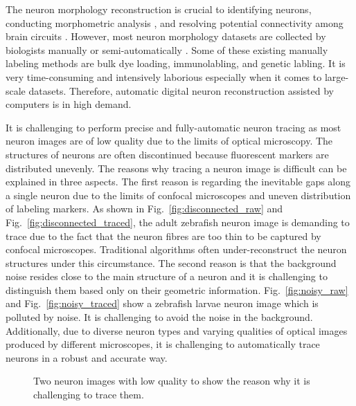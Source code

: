 \documentclass[conference]{IEEEtran}
\begin{document}
The neuron morphology reconstruction is crucial to identifying neurons\cite{background5}, conducting morphometric analysis \cite{background3}, and resolving potential connectivity among brain circuits \cite{background1}. However, most neuron morphology datasets are collected by biologists manually or semi-automatically \cite{background1}. Some of these existing manually labeling methods are bulk dye loading\cite{label1}, immunolabling\cite{label2}, and genetic labling\cite{genetic_label}.
It is very time-consuming and intensively laborious especially when it comes to large-scale datasets.  Therefore, automatic digital neuron reconstruction assisted by computers is in high demand.

It is challenging to perform precise and fully-automatic neuron tracing as most neuron images are of low quality due to the limits of optical microscopy. The structures of neurons are often discontinued because fluorescent markers are distributed unevenly. The reasons why tracing a neuron image is difficult can be explained in three aspects. The first reason is regarding the inevitable gaps along a single neuron due to the limits of confocal microscopes and uneven distribution of labeling markers. As shown in Fig.~\ref{fig:disconnected_raw} and Fig.~\ref{fig:disconnected_traced}, the adult zebrafish neuron image is demanding to trace due to the fact that the neuron fibres are too thin to be captured by confocal microscopes. Traditional algorithms \cite{rayburst, snake} often under-reconstruct the neuron structures under this circumstance. The second reason is that the background noise resides close to the main structure of a neuron and it is challenging to distinguish them based only on their geometric information. Fig.~\ref{fig:noisy_raw} and Fig.~\ref{fig:noisy_traced} show a zebrafish larvae neuron image which is polluted by noise. It is challenging to avoid the noise in the background. Additionally, due to diverse neuron types and varying qualities of optical images produced by different microscopes, it is challenging to automatically trace neurons in a robust and accurate way.


\begin{figure}[!ht]
\centering
{
\caption{Two neuron images with low quality to show the reason why it is challenging to trace them.}
\label{fig:low_quality}
}
\end{figure}
\end{document}
